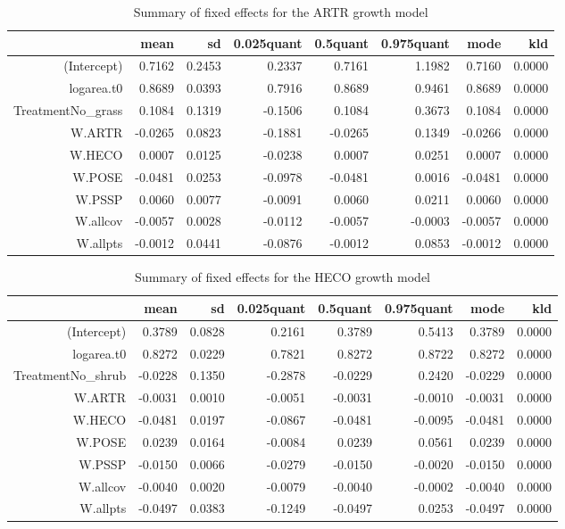 \begin{table}[ht]
\centering
\caption{Summary of fixed effects for the ARTR growth model} 
\label{ARTRgrowth}
\begin{tabular}{rrrrrrrr}
  \hline
 & mean & sd & 0.025quant & 0.5quant & 0.975quant & mode & kld \\ 
  \hline
(Intercept) & 0.7162 & 0.2453 & 0.2337 & 0.7161 & 1.1982 & 0.7160 & 0.0000 \\ 
  logarea.t0 & 0.8689 & 0.0393 & 0.7916 & 0.8689 & 0.9461 & 0.8689 & 0.0000 \\ 
  TreatmentNo\_grass & 0.1084 & 0.1319 & -0.1506 & 0.1084 & 0.3673 & 0.1084 & 0.0000 \\ 
  W.ARTR & -0.0265 & 0.0823 & -0.1881 & -0.0265 & 0.1349 & -0.0266 & 0.0000 \\ 
  W.HECO & 0.0007 & 0.0125 & -0.0238 & 0.0007 & 0.0251 & 0.0007 & 0.0000 \\ 
  W.POSE & -0.0481 & 0.0253 & -0.0978 & -0.0481 & 0.0016 & -0.0481 & 0.0000 \\ 
  W.PSSP & 0.0060 & 0.0077 & -0.0091 & 0.0060 & 0.0211 & 0.0060 & 0.0000 \\ 
  W.allcov & -0.0057 & 0.0028 & -0.0112 & -0.0057 & -0.0003 & -0.0057 & 0.0000 \\ 
  W.allpts & -0.0012 & 0.0441 & -0.0876 & -0.0012 & 0.0853 & -0.0012 & 0.0000 \\ 
   \hline
\end{tabular}
\end{table}

\begin{table}[ht]
\centering
\caption{Summary of fixed effects for the HECO growth model} 
\label{HECOgrowth}
\begin{tabular}{rrrrrrrr}
  \hline
 & mean & sd & 0.025quant & 0.5quant & 0.975quant & mode & kld \\ 
  \hline
(Intercept) & 0.3789 & 0.0828 & 0.2161 & 0.3789 & 0.5413 & 0.3789 & 0.0000 \\ 
  logarea.t0 & 0.8272 & 0.0229 & 0.7821 & 0.8272 & 0.8722 & 0.8272 & 0.0000 \\ 
  TreatmentNo\_shrub & -0.0228 & 0.1350 & -0.2878 & -0.0229 & 0.2420 & -0.0229 & 0.0000 \\ 
  W.ARTR & -0.0031 & 0.0010 & -0.0051 & -0.0031 & -0.0010 & -0.0031 & 0.0000 \\ 
  W.HECO & -0.0481 & 0.0197 & -0.0867 & -0.0481 & -0.0095 & -0.0481 & 0.0000 \\ 
  W.POSE & 0.0239 & 0.0164 & -0.0084 & 0.0239 & 0.0561 & 0.0239 & 0.0000 \\ 
  W.PSSP & -0.0150 & 0.0066 & -0.0279 & -0.0150 & -0.0020 & -0.0150 & 0.0000 \\ 
  W.allcov & -0.0040 & 0.0020 & -0.0079 & -0.0040 & -0.0002 & -0.0040 & 0.0000 \\ 
  W.allpts & -0.0497 & 0.0383 & -0.1249 & -0.0497 & 0.0253 & -0.0497 & 0.0000 \\ 
   \hline
\end{tabular}
\end{table}

